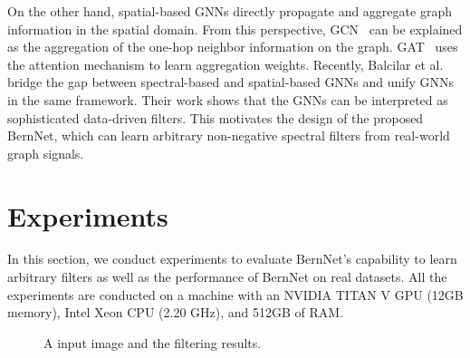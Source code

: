\documentclass{article}
\begin{document}
On the other hand, spatial-based GNNs directly propagate and aggregate graph information in the spatial domain. 
From this perspective, GCN~\cite{kipf2016semi} can be explained as the aggregation of the one-hop neighbor information on the graph. 
GAT~\cite{gat} uses the attention mechanism to learn aggregation weights. 
Recently, Balcilar et al.~\cite{balcilar2021analyzing} bridge the gap between spectral-based and spatial-based GNNs and unify GNNs in the same framework. 
Their work shows that the GNNs can be interpreted as sophisticated data-driven filters. 
This motivates the design of the proposed BernNet, which can learn arbitrary non-negative spectral filters from real-world graph signals.



\section{Experiments}
\label{sec:exp}
In this section, we conduct experiments to evaluate BernNet's capability to learn arbitrary filters as well as the performance of BernNet on real datasets. All the experiments are conducted on a machine with an NVIDIA TITAN V GPU (12GB memory), Intel Xeon CPU (2.20 GHz), and 512GB of RAM.



\begin{figure}[t]
    \centering
   \hspace{-3mm}
   \hspace{-3mm}
   \hspace{-3mm}
   \hspace{-3mm}
   \hspace{-3mm}
\vspace{-2mm}
    \caption{A input image and the filtering results.}
    \label{fig:img_filter}
\end{figure}
\end{document}
